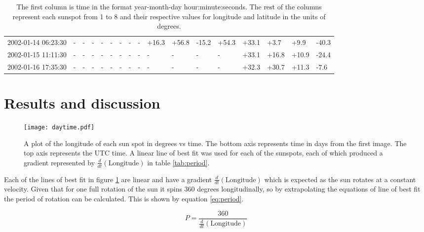 \documentclass[10pt]{article}
\begin{document}
\begin{sidewaystable}
\begin{tabularx}{1.223\textwidth}{l|YY|YY|YY|YY|YY|YY|YY|YY}
		2002-01-14 06:23:30 &  - &  - &  - &  - &  - &  - &  - &  - &  +16.3 &  +56.8 & -15.2 &  +54.3 &  +33.1 &  +3.7 &  +9.9 & -40.3 \\
		2002-01-15 11:11:30 &  - &  - &  - &  - &  - &  - &  - &  - &  - &  - &  - &  - &  +33.1 &  +16.8 &  +10.9 & -24.4 \\
		2002-01-16 17:35:30 &  - &  - &  - &  - &  - &  - &  - &  - &  - &  - &  - &  - &  +32.3 &  +30.7 &  +11.3 & -7.6 \\
		\bottomrule
	\end{tabularx}
	\caption*{The first column is time in the format year-month-day hour:minute:seconds. The rest of the columns represent each sunspot from 1 to 8 and their respective values for longitude and latitude in the units of degrees.}
	\label{tab:longlat}
\end{sidewaystable}

\newpage

\section{Results and discussion}


\begin{figure}[H]
	\centering
	\texttt{[image: daytime.pdf]}
	\caption{A plot of the longitude of each sun spot in degrees vs time. The bottom axis represents time in days from the first image. The top axis represents the UTC time. A linear line of best fit was used for each of the sunspots, each of which produced a gradient represented by $\frac{d}{dt} ( \text{Longitude} )$ in table \ref{tab:period}.}
	\label{fig:long}
\end{figure}

\noindent Each of the lines of best fit in figure \ref{fig:long} are linear and have a gradient $\frac{d}{dt} ( \text{Longitude} )$ which is expected as the sun rotates at a constant velocity. Given that for one full rotation of the sun it spins 360 degrees longitudinally, so by extrapolating the equations of line of best fit the period of rotation can be calculated. This is shown by equation \ref{eq:period}.

\begin{equation}
	P = \frac{360}{\frac{d}{dt} ( \text{Longitude} )}
	\label{eq:period}
\end{equation}
\end{document}
